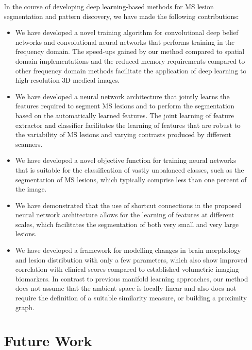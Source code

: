 In the course of developing deep learning-based methods for MS lesion
segmentation and pattern discovery, we have made the following contributions:
\begin{itemize}
\item We have developed a novel training algorithm for convolutional deep belief
networks and convolutional neural networks that performs training in the
frequency domain. The speed-ups gained by our method compared to spatial domain
implementations and the reduced memory requirements compared to other frequency
domain methods facilitate the application of deep learning to high-resolution
3D medical images.
  
\item We have developed a neural network architecture that jointly learns the
features required to segment MS lesions and to perform the segmentation based on
the automatically learned features. The joint learning of feature extractor and
classifier facilitates the learning of features that are robust to the
variability of MS lesions and varying contrasts produced by different scanners.

\item We have developed a novel objective function for training neural networks
that is suitable for the classification of vastly unbalanced classes, such as
the segmentation of MS lesions, which typically comprise less than one percent
of the image.

\item We have demonstrated that the use of shortcut connections in the proposed
neural network architecture allows for the learning of features at different
scales, which facilitates the segmentation of both very small and very large
lesions.

\item We have developed a framework for modelling changes in brain morphology
and lesion distribution with only a few parameters, which also show improved
correlation with clinical scores compared to established volumetric imaging
biomarkers. In contrast to previous manifold learning approaches, our method
does not assume that the ambient space is locally linear and also does not
require the definition of a suitable similarity measure, or building a proximity
graph.
\end{itemize}

\section{Future Work}

